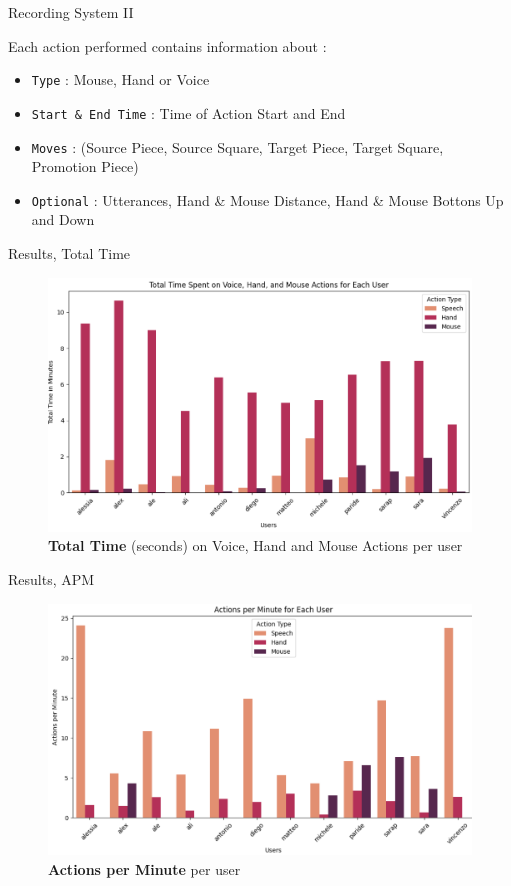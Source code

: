 \documentclass[english]{beamer}
\begin{document}
\begin{frame}{Recording System II}
    
    Each action performed contains information about :   
    \begin{itemize}
            \item \texttt{Type} : Mouse, Hand or Voice
            \item \texttt{Start \& End Time} : Time of Action Start and End 
            \item \texttt{Moves} :  (Source Piece, Source Square, Target Piece, Target Square, Promotion Piece)
            \item \texttt{Optional} : Utterances, Hand \& Mouse Distance, Hand \& Mouse Bottons Up and Down 
    \end{itemize}
\end{frame}


\begin{frame}{Results, Total Time}
    \begin{figure}
        \centering
        \includegraphics[width=.8\textwidth]{images/total_time.png}
        \caption{\textbf{Total Time} (seconds) on Voice, Hand and Mouse Actions per user}
    \end{figure}
\end{frame}

\begin{frame}{Results, APM}
    \begin{figure}
        \centering
        \includegraphics[width=.8\textwidth]{images/actions_per_minutes.png}
        \caption{\textbf{Actions per Minute} per user}
    \end{figure}
\end{frame}
\end{document}
